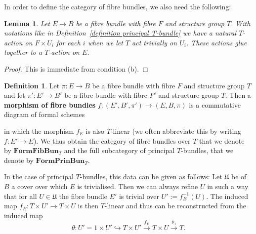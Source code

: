 \documentclass[10pt,oneside]{amsart}
\newtheorem{lemma}[theorem]{Lemma}
\theoremstyle{definition}
\newtheorem{definition}[theorem]{Definition}
\theoremstyle{remark}
\begin{document}
	In order to define the category of  fibre bundles, we also need the following:
	\begin{lemma}
		Let $E\rightarrow B$ be a fibre bundle with fibre $F$ and structure group $T$. With notations like in Definition~\ref{definition principal T-bundle} we have a natural $T$-action on $F\times U_{i}$ for each $i$ when we let $T$ act trivially on $U_{i}$. These actions glue together to a $T$-action on $E$.
	\end{lemma}
	\begin{proof}
		This is immediate from condition (b).
	\end{proof}
	\begin{definition}
		Let $\pi:E\rightarrow B$ be a fibre bundle with fibre $F$ and structure group $T$ and let $\pi':E'\rightarrow B'$ be a fibre bundle with fibre $F'$ and structure group $T$. Then a \textbf{morphism of fibre bundles} $f:(E',B',\pi')\rightarrow (E,B,\pi)$ is a commutative diagram of formal schemes
		\begin{center}
		\end{center}
		in which the morphism $f_E$ is also $T$-linear (we often abbreviate this by writing $f:E'\rightarrow E$). We thus obtain the category of fibre bundles over $T$ that we denote by $\mathbf{FormFibBun}_T$ and the full subcategory of principal $T$-bundles, that we denote by $\mathbf{FormPrinBun}_T$.
	\end{definition}
	
	In the case of principal $T$-bundles, this data can be given as follows: Let $\mathfrak U$ be of $B$ a cover over which $E$ is trivialised. Then we can always refine $U$ in such a way that for all $U\in \mathfrak{U}$ the fibre bundle $E'$ is trivial over $U':=f_B^{-1}(U)$. The induced map $f_E:T\times U'\rightarrow T\times U$ is then $T$-linear and thus can be reconstructed from the induced map
	\[\theta:U'=1\times U'\hookrightarrow T\times U'\xrightarrow{f_E} T\times U\xrightarrow{p_1} T.\]
	
\end{document}
